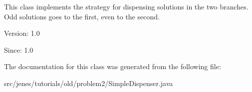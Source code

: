 This class implements the strategy for dispensing solutions in the two branches. Odd solutions goes to the first, even to the second.

\begin{Desc}
\item[Version:]1.0\end{Desc}
\begin{Desc}
\item[Since:]1.0 \end{Desc}


The documentation for this class was generated from the following file:\begin{CompactItemize}
\item 
src/jenes/tutorials/old/problem2/SimpleDispenser.java\end{CompactItemize}
